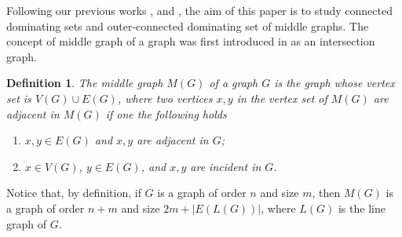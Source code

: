 \documentclass[a4paper,12pt, reqno]{amsart}
\newtheorem{Definition}[Theorem]{Definition}
\begin{document}


Following our previous works \cite{DSFBME}, \cite{KPPT2021color} and \cite{KPPT2021total}, the aim of this paper is to study connected dominating sets and outer-connected dominating set of middle graphs.
The concept of middle graph of a graph was first introduced in \cite{HamYos} as an intersection graph.

\begin{Definition}
 The middle graph $M(G)$ of a graph $G$ is the graph whose vertex set is $V(G)\cup E(G)$, where two vertices $x, y$ in the vertex set of $M(G)$ are adjacent in $M(G)$ if one the following holds
 \begin{enumerate}
 \item $x, y\in E(G)$ and $x, y$ are adjacent in $G$;
 \item $x\in V (G)$, $y\in E(G)$, and $x, y$ are incident in $G$. 
 \end{enumerate}
 \end{Definition}
 
 Notice that, by definition, if $G$ is a graph of order $n$ and size $m$, then $M(G)$ is a graph of order $n+m$ and size $2m+|E(L(G))| $, where $L(G)$ is the line graph of $G$.
 
\end{document}
